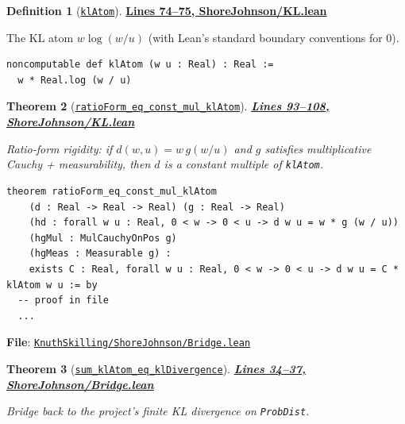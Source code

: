 \documentclass[11pt]{article}
\newtheorem{theorem}{Theorem}[section]
\theoremstyle{definition}
\newtheorem{definition}[theorem]{Definition}
\theoremstyle{remark}
\begin{document}
\begin{definition}[\href{https://github.com/zariuq/ks-foundations-of-inference/blob/main/KnuthSkilling/ShoreJohnson/KL.lean\#L74}{\texttt{klAtom}}]
\textbf{\href{https://github.com/zariuq/ks-foundations-of-inference/blob/main/KnuthSkilling/ShoreJohnson/KL.lean\#L74-L75}{Lines 74--75, ShoreJohnson/KL.lean}}

The KL atom $w \log(w/u)$ (with Lean's standard boundary conventions for $0$).
\end{definition}

\begin{lstlisting}[caption={KL atom divergence}]
noncomputable def klAtom (w u : Real) : Real :=
  w * Real.log (w / u)
\end{lstlisting}

\begin{theorem}[\href{https://github.com/zariuq/ks-foundations-of-inference/blob/main/KnuthSkilling/ShoreJohnson/KL.lean\#L93}{\texttt{ratioForm\_eq\_const\_mul\_klAtom}}]
\textbf{\href{https://github.com/zariuq/ks-foundations-of-inference/blob/main/KnuthSkilling/ShoreJohnson/KL.lean\#L93-L108}{Lines 93--108, ShoreJohnson/KL.lean}}

Ratio-form rigidity: if $d(w,u)=w \, g(w/u)$ and $g$ satisfies multiplicative Cauchy + measurability, then
$d$ is a constant multiple of \texttt{klAtom}.
\end{theorem}

\begin{lstlisting}[caption={Ratio-form rigidity -> constant multiple of klAtom}]
theorem ratioForm_eq_const_mul_klAtom
    (d : Real -> Real -> Real) (g : Real -> Real)
    (hd : forall w u : Real, 0 < w -> 0 < u -> d w u = w * g (w / u))
    (hgMul : MulCauchyOnPos g)
    (hgMeas : Measurable g) :
    exists C : Real, forall w u : Real, 0 < w -> 0 < u -> d w u = C * klAtom w u := by
  -- proof in file
  ...
\end{lstlisting}

\textbf{File}: \href{https://github.com/zariuq/ks-foundations-of-inference/blob/main/KnuthSkilling/ShoreJohnson/Bridge.lean}{\texttt{KnuthSkilling/ShoreJohnson/Bridge.lean}}

\begin{theorem}[\href{https://github.com/zariuq/ks-foundations-of-inference/blob/main/KnuthSkilling/ShoreJohnson/Bridge.lean\#L34}{\texttt{sum\_klAtom\_eq\_klDivergence}}]
\textbf{\href{https://github.com/zariuq/ks-foundations-of-inference/blob/main/KnuthSkilling/ShoreJohnson/Bridge.lean\#L34-L37}{Lines 34--37, ShoreJohnson/Bridge.lean}}

Bridge back to the project’s finite KL divergence on \texttt{ProbDist}.
\end{theorem}
\end{document}
